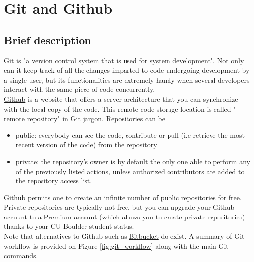 
\section{Git and Github}
\subsection{Brief description}
\href{https://en.wikipedia.org/wiki/Git_(software)}{Git} is "a version control system that is used for system development". Not only can it keep track of all the changes imparted to code undergoing development by a single user, but its functionalities are extremely handy when several developers interact with the same piece of code concurrently.\\
\href{https://github.com/}{Github} is a website that offers a server architecture that you can synchronize with the local copy of the code. This remote code storage location is called " remote repository" in Git jargon. Repositories can be
\begin{itemize}
\item public: everybody can see the code, contribute or pull (i.e retrieve the most recent version of the code) from the repository
\item private: the repository's owner is by default the only one able to perform any of the previously listed actions, unless authorized contributors are added to the repository access list.
\end{itemize} 
Github permits one to create an infinite number of public repositories for free. Private repositories are typically not free, but you can upgrade your Github account to a Premium account (which allows you to create private repositories) thanks to your CU Boulder student status.\\ Note that alternatives to Github such as \href{https://bitbucket.org}{Bitbucket}  do exist.
A summary of Git workflow is provided on Figure \ref{fig:git_workflow} along with the main Git commands.
